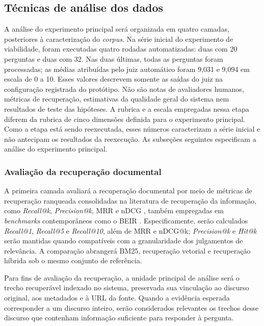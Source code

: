 \subsection{Técnicas de análise dos dados}

\label{sec:analise}

A análise do experimento principal será organizada em quatro camadas, posteriores à caracterização do \textit{corpus}. Na série inicial do experimento de viabilidade, foram executadas quatro rodadas automatizadas: duas com 20 perguntas e duas com 32. Nas duas últimas, todas as perguntas foram processadas; as médias atribuídas pelo juiz automático foram 9,031 e 9,094 em escala de 0 a 10. Esses valores descrevem somente as saídas do juiz na configuração registrada do protótipo. Não são notas de avaliadores humanos, métricas de recuperação, estimativas da qualidade geral do sistema nem resultados de teste das hipóteses. A rubrica e a escala empregadas nessa etapa diferem da rubrica de cinco dimensões definida para o experimento principal. Como a etapa está sendo reexecutada, esses números caracterizam a série inicial e não antecipam os resultados da reexecução. As subseções seguintes especificam a análise do experimento principal.

\subsubsection{Avaliação da recuperação documental}
\label{sec:metricas}

A primeira camada avaliará a recuperação documental por meio de métricas de recuperação ranqueada consolidadas na literatura de recuperação da informação, como
\textit{Recall@k}, \textit{Precision@k}, MRR e nDCG \parencite{manningEtAl2008informationRetrieval}, também empregadas em
\textit{benchmarks} contemporâneos como o BEIR \parencite{thakurEtAl2021beir}. Especificamente, serão calculados
\textit{Recall@1}, \textit{Recall@5} e \textit{Recall@10}, além de MRR e nDCG@k; \textit{Precision@k} e \textit{Hit@k} serão mantidas
quando compatíveis com a granularidade dos julgamentos de relevância. A comparação abrangerá BM25, recuperação vetorial e recuperação
híbrida sob o mesmo conjunto de referência.

Para fins de avaliação da recuperação, a unidade principal de análise será o trecho recuperável indexado no sistema, preservada sua vinculação ao discurso original, aos metadados e à URL da fonte. Quando a evidência esperada corresponder a um discurso inteiro, serão considerados relevantes os trechos desse discurso que contenham informação suficiente para responder à pergunta.

